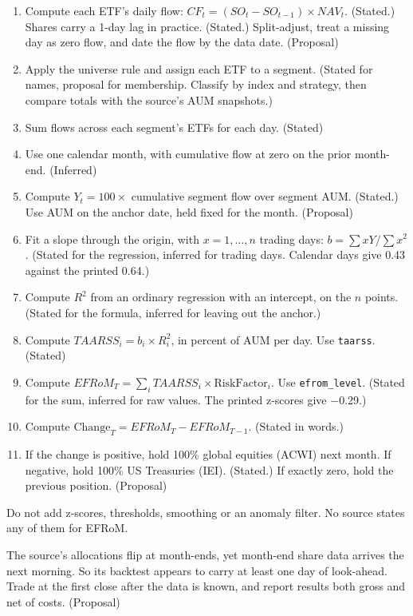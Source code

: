 \documentclass[11pt,a4paper]{article}
\newcommand{\code}[1]{\nolinkurl{#1}}
\newcommand{\sublabel}[1]{\par\vspace{3pt}\needspace{3\baselineskip}{\sffamily\small\bfseries #1}\par\nopagebreak[4]\vspace{1pt}}
\begin{document}
\sublabel{Steps}
\begin{enumerate}
\item Compute each ETF's daily flow: $CF_t = (SO_t - SO_{t-1}) \times NAV_t$. (Stated.) Shares carry a 1-day lag in practice. (Stated.) Split-adjust, treat a missing day as zero flow, and date the flow by the data date. (Proposal)
\item Apply the universe rule and assign each ETF to a segment. (Stated for names, proposal for membership. Classify by index and strategy, then compare totals with the source's AUM snapshots.)
\item Sum flows across each segment's ETFs for each day. (Stated)
\item Use one calendar month, with cumulative flow at zero on the prior month-end. (Inferred)
\item Compute $Y_t = 100 \times$ cumulative segment flow over segment AUM. (Stated.) Use AUM on the anchor date, held fixed for the month. (Proposal)
\item Fit a slope through the origin, with $x = 1, \dots, n$ trading days: $b = \sum x Y / \sum x^2$. (Stated for the regression, inferred for trading days. Calendar days give 0.43 against the printed 0.64.)
\item Compute $R^2$ from an ordinary regression with an intercept, on the $n$ points. (Stated for the formula, inferred for leaving out the anchor.)
\item Compute $TAARSS_i = b_i \times R^2_i$, in percent of AUM per day. Use \code{taarss}. (Stated)
\item Compute $EFRoM_T = \sum_i TAARSS_i \times \text{RiskFactor}_i$. Use \code{efrom_level}. (Stated for the sum, inferred for raw values. The printed z-scores give $-$0.29.)
\item Compute $\text{Change}_T = EFRoM_T - EFRoM_{T-1}$. (Stated in words.)
\item If the change is positive, hold 100\% global equities (ACWI) next month. If negative, hold 100\% US Treasuries (IEI). (Stated.) If exactly zero, hold the previous position. (Proposal)
\end{enumerate}

Do not add z-scores, thresholds, smoothing or an anomaly filter. No source states any of them for EFRoM.

\begin{warnbox}[Timing]
The source's allocations flip at month-ends, yet month-end share data arrives the next morning. So its backtest appears to carry at least one day of look-ahead. Trade at the first close after the data is known, and report results both gross and net of costs. (Proposal)
\end{warnbox}
\end{document}
